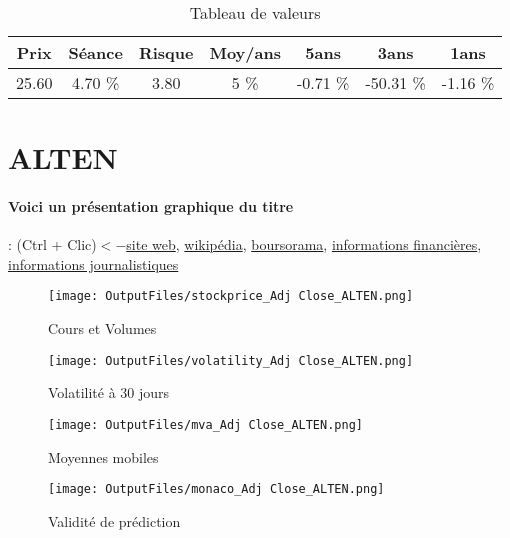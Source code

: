 \documentclass[11pt,a4paper]{report}%
\begin{document}
\begin{table}[H]
  \centering
    \begin{tabular}{|c|c|c|c|c|c|c|}
    \hline
    Prix & Séance & Risque  & Moy/ans & 5ans & 3ans & 1ans \\
    \hline
    25.60 &    4.70 \%    & 3.80 & 5 \% & -0.71 \% & -50.31 \% & -1.16 \% \\
    \hline
    \end{tabular}%
        \label{tab:table_AKKA TECHNO5IES}%
      \caption{Tableau de valeurs}
\end{table}%

\newpage

\section{ALTEN}

\paragraph{Voici un présentation graphique du titre} : (Ctrl + Clic)$<-$\href{https://www.alten.com/fr/investisseurs/}{site web}, \href{https://fr.wikipedia.org/wiki/Alten}{wikipédia}, \href{https://www.boursorama.com/cours/1rPATE}{boursorama}, \href{https://www.qwant.com/?q=site:https:%2f%2fwww.easybourse.com%2faction-societe%2fALTEN&t=web&client=ext-firefox-hp}{informations financières}, \href{https://bourse.lerevenu.com/cours-de-bourse/fiche-valeur-synthese/ALTEN/ATE-FR}{informations journalistiques}
\begin{figure}[!htb]
   \begin{minipage}{0.5\textwidth}
     \centering
     \texttt{[image: OutputFiles/stockprice\_Adj Close\_ALTEN.png]}
     \caption{Cours et Volumes}\label{Fig:price_ALTEN}
   \end{minipage}\hfill
   \begin{minipage}{0.5\textwidth}
     \centering
     \texttt{[image: OutputFiles/volatility\_Adj Close\_ALTEN.png]}
     \caption{Volatilité à 30 jours}\label{Fig:volat_ALTEN}
   \end{minipage}
\end{figure}
\begin{figure}[!htb]
   \begin{minipage}{0.5\textwidth}
     \centering
     \texttt{[image: OutputFiles/mva\_Adj Close\_ALTEN.png]}
     \caption{Moyennes mobiles}\label{Fig:mva_ALTEN}
   \end{minipage}\hfill
   \begin{minipage}{0.5\textwidth}
     \centering
     \texttt{[image: OutputFiles/monaco\_Adj Close\_ALTEN.png]}
     \caption{Validité de prédiction}\label{Fig:prediction_ALTEN}
   \end{minipage}
\end{figure}
\end{document}
